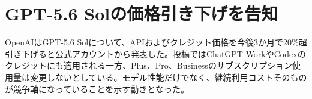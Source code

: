 \section{GPT-5.6 Solの価格引き下げを告知}
OpenAIはGPT-5.6 Solについて、APIおよびクレジット価格を今後3か月で20\%超引き下げると公式アカウントから発表した。投稿ではChatGPT WorkやCodexのクレジットにも適用される一方、Plus、Pro、Businessのサブスクリプション使用量は変更しないとしている。モデル性能だけでなく、継続利用コストそのものが競争軸になっていることを示す動きとなった。

